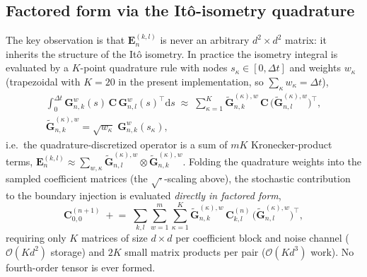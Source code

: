 \documentclass[preprint,12pt]{elsarticle}
\begin{document}
\subsection{Factored form via the It\^o-isometry quadrature}
The key observation is that $\mathbf{E}^{(k,l)}_n$ is never an arbitrary $d^2\times d^2$ matrix: it inherits the structure of the It\^o isometry. In practice the isometry integral is evaluated by a $K$-point quadrature rule with nodes $s_\kappa \in [0,\Delta t]$ and weights $w_\kappa$ (trapezoidal with $K=20$ in the present implementation, so $\sum_\kappa w_\kappa = \Delta t$),
\begin{equation}
\label{eq:kron_quad}
\begin{gathered}
\int_0^{\Delta t} \mathbf{G}^w_{n,k}(s)\, \mathbf{C}\, \mathbf{G}^w_{n,l}(s)^\top \mathrm{d}s
\;\approx\; \sum_{\kappa=1}^{K} \tilde{\mathbf{G}}^{(\kappa),w}_{n,k}\, \mathbf{C}\, \big(\tilde{\mathbf{G}}^{(\kappa),w}_{n,l}\big)^{\!\top}, \\
\tilde{\mathbf{G}}^{(\kappa),w}_{n,k} = \sqrt{w_\kappa}\; \mathbf{G}^w_{n,k}(s_\kappa),
\end{gathered}
\end{equation}
i.e.\ the quadrature-discretized operator is a sum of $mK$ Kronecker-product terms, $\mathbf{E}^{(k,l)}_n \approx \sum_{w,\kappa} \tilde{\mathbf{G}}^{(\kappa),w}_{n,l} \otimes \tilde{\mathbf{G}}^{(\kappa),w}_{n,k}$. Folding the quadrature weights into the sampled coefficient matrices (the $\sqrt{\cdot}$-scaling above), the stochastic contribution to the boundary injection is evaluated \emph{directly in factored form},
\begin{equation}
\label{eq:factored_apply}
\mathbf{C}_{0,0}^{(n+1)} \;\mathrel{+}=\; \sum_{k,l}\sum_{w=1}^{m}\sum_{\kappa=1}^{K} \tilde{\mathbf{G}}^{(\kappa),w}_{n,k}\, \mathbf{C}^{(n)}_{k,l}\, \big(\tilde{\mathbf{G}}^{(\kappa),w}_{n,l}\big)^{\!\top},
\end{equation}
requiring only $K$ matrices of size $d\times d$ per coefficient block and noise channel ($\mathcal{O}(K d^2)$ storage) and $2K$ small matrix products per pair ($\mathcal{O}(K d^3)$ work). No fourth-order tensor is ever formed.
\end{document}
